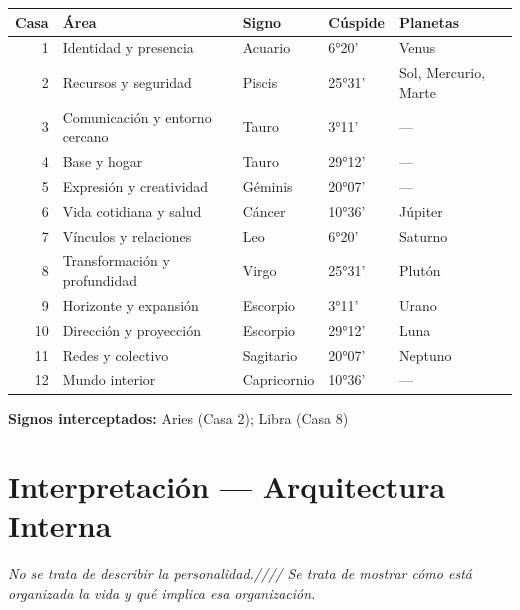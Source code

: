 \documentclass[11pt,a4paper]{article}
\begin{document}
\begin{center}
\begin{tabular}{rllll}
  \toprule
  \textbf{Casa} & \textbf{Área} & \textbf{Signo} & \textbf{Cúspide} & \textbf{Planetas} \\
  \midrule
  1 & Identidad y presencia & Acuario & 6°20' & Venus \\
  2 & Recursos y seguridad & Piscis & 25°31' & Sol, Mercurio, Marte \\
  3 & Comunicación y entorno cercano & Tauro & 3°11' & — \\
  4 & Base y hogar & Tauro & 29°12' & — \\
  5 & Expresión y creatividad & Géminis & 20°07' & — \\
  6 & Vida cotidiana y salud & Cáncer & 10°36' & Júpiter \\
  7 & Vínculos y relaciones & Leo & 6°20' & Saturno \\
  8 & Transformación y profundidad & Virgo & 25°31' & Plutón \\
  9 & Horizonte y expansión & Escorpio & 3°11' & Urano \\
  10 & Dirección y proyección & Escorpio & 29°12' & Luna \\
  11 & Redes y colectivo & Sagitario & 20°07' & Neptuno \\
  12 & Mundo interior & Capricornio & 10°36' & — \\
  \bottomrule
\end{tabular}
\end{center}

\vspace{0.3cm}\textbf{Signos interceptados:} Aries (Casa 2); Libra (Casa 8)

\newpage

\section{Interpretación — Arquitectura Interna}

\begin{center}
{\small\itshape
No se trata de describir la personalidad.////
Se trata de mostrar cómo está organizada la vida y qué implica esa organización.
}
\end{center}

\vspace{0.5cm}

\end{document}

